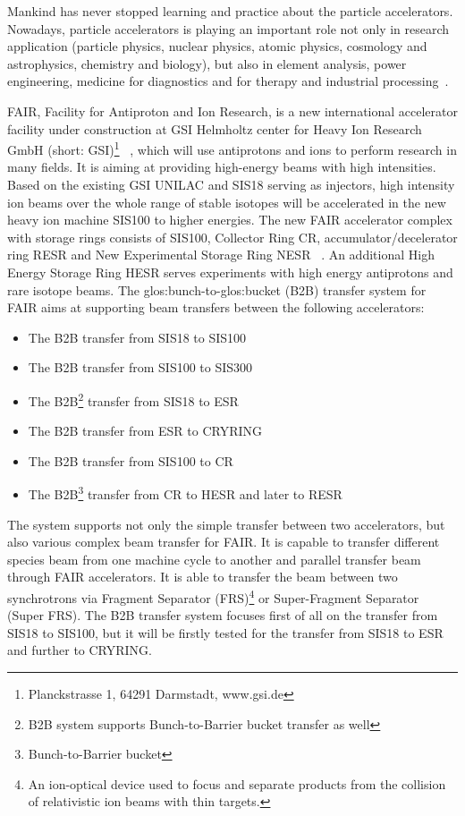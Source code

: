 Mankind has never stopped learning and practice about the particle accelerators. Nowadays, particle accelerators is playing an important role not only in research application (particle physics, nuclear physics, atomic physics, cosmology and astrophysics, chemistry and biology), but also in element analysis, power engineering, medicine for diagnostics and for therapy and industrial processing~\cite{barbalat_applications_1994}. 


FAIR, Facility for Antiproton and Ion Research, is a new international accelerator facility under construction at GSI Helmholtz center for Heavy Ion Research GmbH (short: GSI)\footnote{Planckstrasse 1, 64291 Darmstadt, www.gsi.de} ~\cite{eschke_international_2005, _fair_2011}, which will use antiprotons and ions to perform research in many fields. It is aiming at providing high-energy beams with high intensities. Based on the existing GSI \gls{UNILAC} and SIS18 serving as injectors, high intensity ion beams over the whole range of stable isotopes will be accelerated in the new heavy ion machine SIS100 to higher energies. The new FAIR accelerator complex with storage rings consists of SIS100, Collector Ring CR, accumulator/decelerator ring RESR and New Experimental Storage Ring NESR ~\cite{spiller_fair_2006, steck_advanced_2008}. An additional High Energy Storage Ring HESR serves experiments with high energy antiprotons and rare isotope beams. The \gls{glos:bunch}-to-\gls{glos:bucket} (\gls{B2B}) transfer system for FAIR aims at supporting beam transfers between the following accelerators:
\begin{itemize}
\item The B2B transfer from \gls{SIS18} to \gls{SIS100}
\item The B2B transfer from \gls{SIS100} to \gls{SIS300}
\item The B2B\footnote{B2B system supports Bunch-to-Barrier bucket transfer as well} transfer from SIS18 to \gls{ESR}
\item The B2B transfer from ESR to CRYRING
\item The B2B transfer from SIS100 to \gls{CR}
\item The B2B\footnote{Bunch-to-Barrier bucket} transfer from CR to \gls{HESR} and later to \gls{RESR}
\end{itemize}

The system supports not only the simple transfer between two accelerators, but also various complex beam transfer for FAIR. It is capable to transfer different species beam from one machine cycle to another and parallel transfer beam through FAIR accelerators. It is able to transfer the beam between two synchrotrons via Fragment Separator (\gls{FRS})\footnote{An ion-optical device used to focus and separate products from the collision of relativistic ion beams with thin targets.} or Super-Fragment Separator (Super FRS). The B2B transfer system focuses first of all on the transfer from SIS18 to SIS100, but it will be firstly tested for the transfer from SIS18 to ESR and further to CRYRING.  

